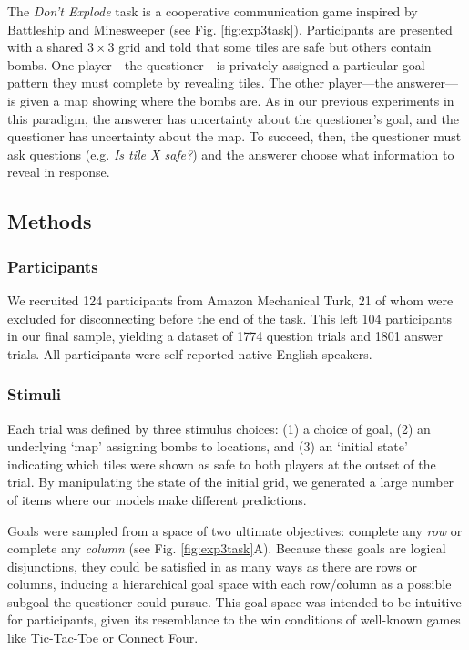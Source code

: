 \documentclass[12pt, floatsintext, jou]{apa6}
\begin{document}
The \emph{Don't Explode} task is a cooperative communication game inspired by Battleship and Minesweeper (see Fig. \ref{fig:exp3task}). 
Participants are presented with a shared $3 \times 3$ grid and told that some tiles are safe but others contain bombs.
One player---the questioner---is privately assigned a particular goal pattern they must complete by revealing tiles.
The other player---the answerer---is given a map showing where the bombs are.
As in our previous experiments in this paradigm, the answerer has uncertainty about the questioner's goal, and the questioner has uncertainty about the map.
To succeed, then, the questioner must ask questions (e.g. \emph{Is tile X safe?}) and the answerer choose what information to reveal in response.

\subsection{Methods}

\subsubsection{Participants}

We recruited 124 participants from Amazon Mechanical Turk, 21 of whom were excluded for disconnecting before the end of the task. 
This left 104 participants in our final sample, yielding a dataset of 1774 question trials and 1801 answer trials. 
All participants were self-reported native English speakers.

\subsubsection{Stimuli}

Each trial was defined by three stimulus choices: (1) a choice of goal, (2) an underlying `map' assigning bombs to locations, and (3) an `initial state' indicating which tiles were shown as safe to both players at the outset of the trial.
By manipulating the state of the initial grid, we generated a large number of items where our models make different predictions. 

Goals were sampled from a space of two ultimate objectives: complete any \emph{row} or complete any \emph{column} (see Fig. \ref{fig:exp3task}A).
Because these goals are logical disjunctions, they could be satisfied in as many ways as there are rows or columns, inducing a hierarchical goal space with each row/column as a possible subgoal the questioner could pursue.
This goal space was intended to be intuitive for participants, given its resemblance to the win conditions of well-known games like Tic-Tac-Toe or Connect Four.
\end{document}
